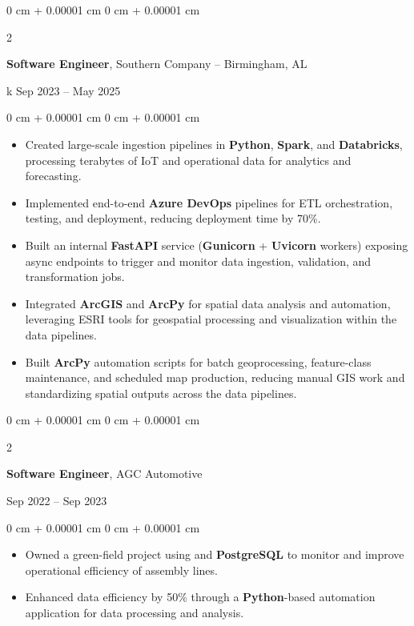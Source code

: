 \documentclass[10pt, letterpaper]{article}
\newenvironment{highlights}{
    \begin{itemize}[
        topsep=0.10 cm,
        parsep=0.10 cm,
        partopsep=0pt,
        itemsep=0pt,
        leftmargin=0 cm + 10pt
    ]
}{
    \end{itemize}
} %
\newenvironment{onecolentry}{
    \begin{adjustwidth}{
        0 cm + 0.00001 cm
    }{
        0 cm + 0.00001 cm
    }
}{
    \end{adjustwidth}
} %
\newenvironment{twocolentry}[2][]{
    \onecolentry
    \def\secondColumn{#2}
    \setcolumnwidth{\fill, 3.4 cm}
    \begin{paracol}{2}
}{
    \switchcolumn \raggedleft \secondColumn
    \end{paracol}
    \endonecolentry
} %
\begin{document}
\vspace{0.2 cm}

\begin{twocolentry}{k    Sep 2023 -- May 2025
}
    \textbf{Software Engineer}, Southern Company -- Birmingham, AL
\end{twocolentry}

\begin{onecolentry}
    \begin{highlights}
        \item Created large-scale ingestion pipelines in \textbf{Python}, \textbf{Spark}, and \textbf{Databricks}, processing terabytes of IoT and operational data for analytics and forecasting.
        \item Implemented end-to-end \textbf{Azure DevOps} pipelines for ETL orchestration, testing, and deployment, reducing deployment time by 70\%.
        \item Built an internal \textbf{FastAPI} service (\textbf{Gunicorn} + \textbf{Uvicorn} workers) exposing async endpoints to trigger and monitor data ingestion, validation, and transformation jobs.
        \item Integrated \textbf{ArcGIS} and \textbf{ArcPy} for spatial data analysis and automation, leveraging ESRI tools for geospatial processing and visualization within the data pipelines.
        \item Built \textbf{ArcPy} automation scripts for batch geoprocessing, feature-class maintenance, and scheduled map production, reducing manual GIS work and standardizing spatial outputs across the data pipelines.

    \end{highlights}
\end{onecolentry}

\vspace{0.2 cm}

        \begin{twocolentry}{
            Sep 2022 -- Sep 2023
        }
\textbf{Software Engineer}, AGC Automotive
\end{twocolentry}
\begin{onecolentry}
\begin{highlights}
    \item Owned a green-field project using  and \textbf{PostgreSQL} to monitor and improve operational efficiency of assembly lines. %
    \item Enhanced data efficiency by 50\% through a \textbf{Python}-based automation application for data processing and analysis.
\end{highlights}

\end{onecolentry}
\vspace{0.2 cm}
\end{document}
